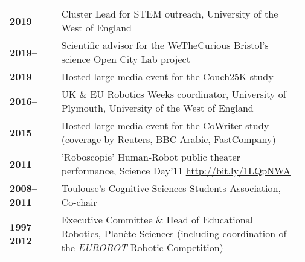 \begin{tabular}{p{0.17\linewidth}p{0.8\linewidth}}

    \bf 2019--& Cluster Lead for STEM outreach, University of the West of England \\
    \bf 2019--& Scientific advisor for the WeTheCurious Bristol's science Open City Lab project \\
    \bf 2019 & Hosted \href{https://share.coveragebook.com/b/6d7defc7c4a49e93}{large media event} for the Couch25K study~\cite{winkle2020insitu} \\
    \bf 2016--& UK \& EU Robotics Weeks coordinator, University of Plymouth, University of the West of England \\
    \bf 2015 & Hosted large media event for the CoWriter study~\cite{lemaignan2016learning} (coverage by Reuters, BBC Arabic, FastCompany) \\
    \bf 2011& 'Roboscopie' Human-Robot public theater performance, Science Day'11 \url{http://bit.ly/1LQpNWA} \\
    \bf 2008--2011& Toulouse's Cognitive Sciences Students Association, Co-chair \\
    \bf 1997--2012& Executive Committee \& Head of Educational Robotics, Planète Sciences (including coordination of the \textit{EUROBOT} Robotic Competition) \\

\end{tabular}
\vspace{2em}








